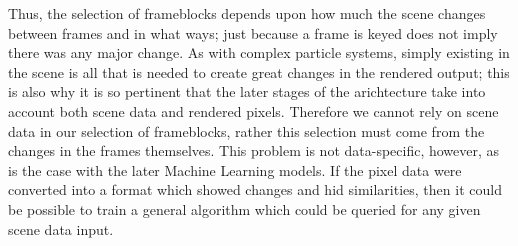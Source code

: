 \documentclass[conference]{IEEEtran}
\begin{document}
Thus, the selection of frameblocks depends upon how much the scene changes
between frames and in what ways;
just because a frame is keyed does not imply there was any major change.
As with complex particle systems, simply existing in the scene is all that is
needed to create great changes in the rendered output;
this is also why it is so pertinent that the later stages of the arichtecture
take into account both scene data and rendered pixels.
Therefore we cannot rely on scene data in our selection of frameblocks, rather
this selection must come from the changes in the frames themselves.
This problem is not data-specific,
however, as is the case with the later Machine Learning models.
If the pixel data were converted into a format which showed changes and hid similarities,
then it could be possible to train a general algorithm which could be queried
for any given scene data input.

\end{document}
